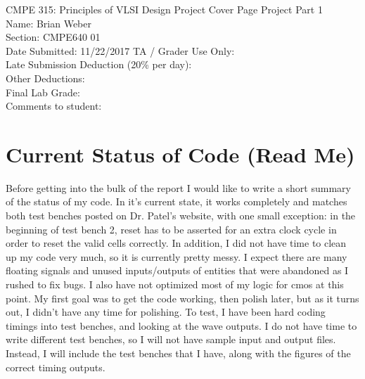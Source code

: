 \documentclass[10pt]{article}
\begin{document}
\begin{titlepage}
\centering
\huge{CMPE 315: Principles of VLSI Design Project Cover Page}
\vfill
\flushleft
\large{
Project Part 1\\
}
\vfill
Name: Brian Weber\\
Section: CMPE640 01\\
\vfill
Date Submitted: 11/22/2017
\vfill
\Large{TA / Grader Use Only:}\\
Late Submission Deduction (20\% per day):\\
\vspace{1cm}
Other Deductions:\\
\vspace{3cm}
Final Lab Grade:\\
\vspace{1cm}
Comments to student:\\
\vspace{5cm}
\end{titlepage}
\tableofcontents
    \section{Current Status of Code (Read Me)}
        Before getting into the bulk of the report I would like to write a short
summary of the status of my code. In it's current state, it works completely and
matches both test benches posted on Dr. Patel's website, with one small
exception: in the beginning of test bench 2, reset has to be asserted for an
extra clock cycle in order to reset the valid cells correctly. In addition, I
did not have time to clean up my code very much, so it is currently pretty
messy. I expect there are many floating signals and unused inputs/outputs of
entities that were abandoned as I rushed to fix bugs. I also have not
optimized most of my logic for cmos at this point. My first goal was to get the
code working, then polish later, but as it turns out, I didn't have any time for
polishing. To test, I have been hard coding timings into test benches, and
looking at the wave outputs. I do not have time to write different test benches,
so I will not have sample input and output files. Instead, I will include the
test benches that I have, along with the figures of the correct timing outputs.
\end{document}
